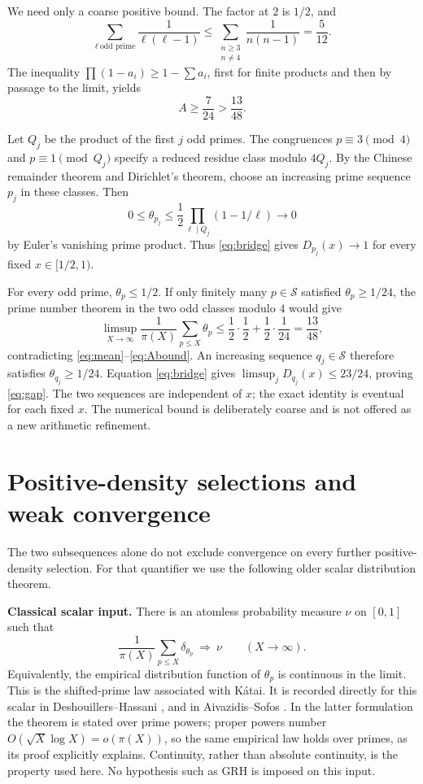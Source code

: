 \documentclass[11pt]{article}
\theoremstyle{remark}
\begin{document}
We need only a coarse positive bound. The factor at $2$ is $1/2$,
and
\[
 \sum_{\ell\ \text{odd prime}}\frac1{\ell(\ell-1)}
 \le\sum_{\substack{n\ge3\\n\ne4}}\frac1{n(n-1)}=\frac5{12}.
\]
The inequality $\prod(1-a_i)\ge1-\sum a_i$, first for finite products
and then by passage to the limit, yields
\begin{equation}\label{eq:Abound}
 A\ge\frac7{24}>\frac{13}{48}.
\end{equation}

Let $Q_j$ be the product of the first $j$ odd primes. The congruences
$p\equiv3\pmod4$ and $p\equiv1\pmod{Q_j}$ specify a reduced residue
class modulo $4Q_j$. By the Chinese remainder theorem and Dirichlet's
theorem, choose an increasing prime sequence $p_j$ in these classes.
Then
\[
 0\le\theta_{p_j}\le\frac12\prod_{\ell\mid Q_j}(1-1/\ell)
 \longrightarrow0
\]
by Euler's vanishing prime product. Thus \eqref{eq:bridge} gives
$D_{p_j}(x)\to1$ for every fixed $x\in[1/2,1)$.

For every odd prime, $\theta_p\le1/2$. If only finitely many
$p\in\mathcal S$ satisfied $\theta_p\ge1/24$, the prime number theorem
in the two odd classes modulo $4$ would give
\[
 \limsup_{X\to\infty}\frac1{\pi(X)}\sum_{p\le X}\theta_p
 \le\frac12\cdot\frac12+\frac12\cdot\frac1{24}
 =\frac{13}{48},
\]
contradicting \eqref{eq:mean}--\eqref{eq:Abound}. An increasing
sequence $q_j\in\mathcal S$ therefore satisfies
$\theta_{q_j}\ge1/24$. Equation \eqref{eq:bridge} gives
$\limsup_jD_{q_j}(x)\le23/24$, proving \eqref{eq:gap}.
The two sequences are independent of $x$; the exact identity is
eventual for each fixed $x$. The numerical bound is deliberately coarse
and is not offered as a new arithmetic refinement.

\section{Positive-density selections and weak convergence}
The two subsequences alone do not exclude convergence on every further
positive-density selection. For that quantifier we use the following
older scalar distribution theorem.

\medskip\noindent\textbf{Classical scalar input.}
There is an atomless probability measure $\nu$ on $[0,1]$ such that
\begin{equation}\label{eq:scalar}
 \frac1{\pi(X)}\sum_{p\le X}\delta_{\theta_p}
 \ \Longrightarrow\ \nu\qquad(X\to\infty).
\end{equation}
Equivalently, the empirical distribution function of $\theta_p$ is
continuous in the limit. This is the shifted-prime law associated
with K\'atai. It is recorded directly for this scalar in
Deshouillers--Hassani \cite[\S\S1--2, Proposition 2.1 with $m=2$]{DH},
and in Aivazidis--Sofos \cite[Theorem 1.3(i), $n=1$, and \S6]{AS}.
In the latter formulation the theorem is stated over prime powers;
proper powers number $O(\sqrt X\log X)=o(\pi(X))$, so the same
empirical law holds over primes, as its proof explicitly explains.
Continuity, rather than absolute continuity, is the property used here.
No hypothesis such as GRH is imposed on this input.
\end{document}
